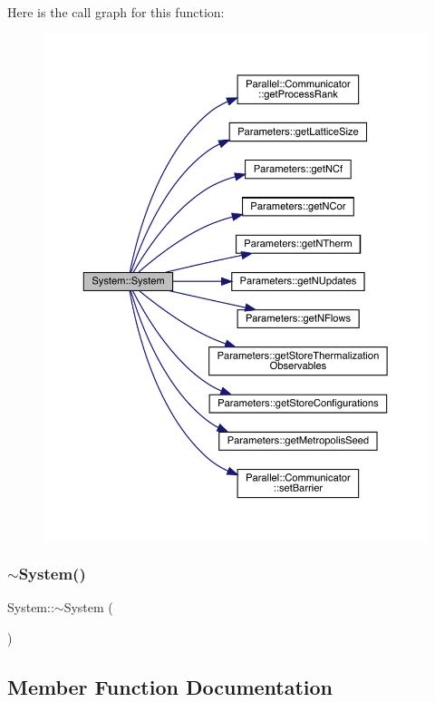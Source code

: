 Here is the call graph for this function\+:\nopagebreak
\begin{figure}[H]
\begin{center}
\leavevmode
\includegraphics[width=350pt]{class_system_ae317936c9bcf1374d61745572e0f2f8a_cgraph}
\end{center}
\end{figure}
\mbox{\label{class_system_a3be70bb338e3f062f821173fd15680d0}} 
\subsubsection{\texorpdfstring{$\sim$System()}{~System()}}
{\footnotesize\ttfamily System\+::$\sim$\+System (\begin{DoxyParamCaption}{ }\end{DoxyParamCaption})}



\subsection{Member Function Documentation}
\mbox{\label{class_system_a93c8a8258ac8f6382ec393bca1271011}} 
